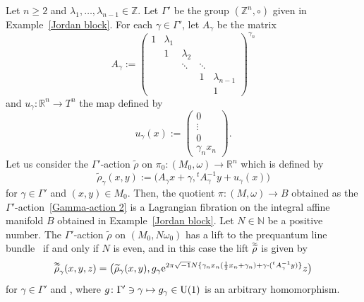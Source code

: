 \documentclass[pdftex]{sigma}
\numberwithin{equation}{section}
\newcommand{\C}{\mathbb{C}}
\newcommand{\R}{\mathbb{R}}
\newcommand{\Z}{\mathbb{Z}}
\newcommand{\N}{\mathbb{N}}
\renewcommand{\tilde}{\widetilde}
\newcommand{\vardbtilde}[1]{\tilde{\raisebox{0pt}[0.85\height]{$\tilde{#1}$}}}
\begin{document}
\begin{Example}\label{Jordan block2}
Let $n\ge 2$ and $\lambda_1,\ldots, \lambda_{n-1}\in \Z$. Let $\Gamma'$ be the group $(\Z^n,\circ )$ given in Example~\ref{Jordan block}. For each $\gamma\in \Gamma'$, let $A_\gamma$ be the matrix
\[
A_\gamma:=
\begin{pmatrix}
1 & \lambda_1 & & & \\
 & 1 & \lambda_2 & & \\
 & & \ddots & \ddots & \\
 & & & 1 & \lambda_{n-1}\\
 & & & & 1
\end{pmatrix}^{\gamma_n}
\]
and $u_\gamma\colon \R^n\to T^n$ the map defined by
\[
u_\gamma (x):=
\begin{pmatrix}
0 \\
\vdots \\
0 \\
\gamma_nx_n
\end{pmatrix}.
\]
Let us consider the $\Gamma'$-action ${\tilde\rho}$ on $\pi_0\colon ( M_0,\omega)\to \R^n$ which is defined by
\begin{equation}\label{Gamma-action 2}
{\tilde \rho}_\gamma (x,y):=\bigl( A_\gamma x+\gamma , {}^tA_\gamma^{-1}y+u_\gamma (x)\bigr)
\end{equation}
for $\gamma\in \Gamma'$ and $(x,y)\in M_0$. Then, the quotient $\pi\colon (M,\omega)\to B$ obtained as the $\Gamma'$-action~\eqref{Gamma-action 2} is a Lagrangian fibration on the integral affine manifold $B$ obtained in Example~\ref{Jordan block}.
%
Let ${N\in \N}$ be a positive number. The $\Gamma'$-action ${\tilde \rho}$ on $(M_0, N\omega_0)$ has a lift to the prequantum line bundle~ if and only if $N$ is even, and in this case the lift ${\vardbtilde \rho}$ is given by
\[
{\vardbtilde \rho}_\gamma (x,y,z)=\bigl({\tilde \rho}_\gamma (x,y), g_\gamma {\rm e}^{2\pi\sqrt{-1}N\{ \gamma_n x_n(\frac{1}{2}x_n+\gamma_n)+\gamma\cdot ({}^tA_\gamma^{-1}y)\}}z\bigr)
\]
for $\gamma\in \Gamma'$ and \smash{$(x,y,z)\in L_0^{\otimes N}\cong \R^n\times T^n\times \C$}, where $g\colon \Gamma' \ni \gamma\mapsto g_\gamma\in {\rm U}(1)$ is an arbitrary homomorphism.
\end{Example}
\end{document}
